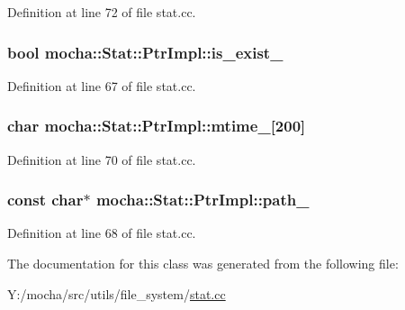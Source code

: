 Definition at line 72 of file stat.cc.

\hypertarget{classmocha_1_1_stat_1_1_ptr_impl_ac04eb4e360c11e9012a05044a4636ed7}{
\subsubsection[{is\_\-exist\_\-}]{\setlength{\rightskip}{0pt plus 5cm}bool {\bf mocha::Stat::PtrImpl::is\_\-exist\_\-}}}
\label{classmocha_1_1_stat_1_1_ptr_impl_ac04eb4e360c11e9012a05044a4636ed7}


Definition at line 67 of file stat.cc.

\hypertarget{classmocha_1_1_stat_1_1_ptr_impl_a43811c5688d4ad9cfef5352b285bce88}{
\subsubsection[{mtime\_\-}]{\setlength{\rightskip}{0pt plus 5cm}char {\bf mocha::Stat::PtrImpl::mtime\_\-}\mbox{[}200\mbox{]}}}
\label{classmocha_1_1_stat_1_1_ptr_impl_a43811c5688d4ad9cfef5352b285bce88}


Definition at line 70 of file stat.cc.

\hypertarget{classmocha_1_1_stat_1_1_ptr_impl_a6554904b0eb3a343d6183b0298b1c325}{
\subsubsection[{path\_\-}]{\setlength{\rightskip}{0pt plus 5cm}const char$\ast$ {\bf mocha::Stat::PtrImpl::path\_\-}}}
\label{classmocha_1_1_stat_1_1_ptr_impl_a6554904b0eb3a343d6183b0298b1c325}


Definition at line 68 of file stat.cc.



The documentation for this class was generated from the following file:\begin{DoxyCompactItemize}
\item 
Y:/mocha/src/utils/file\_\-system/\hyperlink{stat_8cc}{stat.cc}\end{DoxyCompactItemize}
